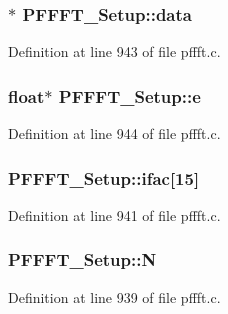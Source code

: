 \subsubsection[{\texorpdfstring{data}{data}}]{$\ast$ P\+F\+F\+F\+T\+\_\+\+Setup\+::data}\hypertarget{struct_p_f_f_f_t___setup_a52a6ca29e3a4c59f54070a622db4ec3f}{}\label{struct_p_f_f_f_t___setup_a52a6ca29e3a4c59f54070a622db4ec3f}


Definition at line 943 of file pffft.\+c.

\subsubsection[{\texorpdfstring{e}{e}}]{\setlength{\rightskip}{0pt plus 5cm}float$\ast$ P\+F\+F\+F\+T\+\_\+\+Setup\+::e}\hypertarget{struct_p_f_f_f_t___setup_af063d9d895bb58628cd9116079cc72b6}{}\label{struct_p_f_f_f_t___setup_af063d9d895bb58628cd9116079cc72b6}


Definition at line 944 of file pffft.\+c.

\subsubsection[{\texorpdfstring{ifac}{ifac}}]{ P\+F\+F\+F\+T\+\_\+\+Setup\+::ifac\mbox{[}15\mbox{]}}\hypertarget{struct_p_f_f_f_t___setup_a71ab430945d91b2e534e1c6c50a7fbdf}{}\label{struct_p_f_f_f_t___setup_a71ab430945d91b2e534e1c6c50a7fbdf}


Definition at line 941 of file pffft.\+c.

\subsubsection[{\texorpdfstring{N}{N}}]{ P\+F\+F\+F\+T\+\_\+\+Setup\+::N}\hypertarget{struct_p_f_f_f_t___setup_a328951e60dcbf47bb9d89946cf67571d}{}\label{struct_p_f_f_f_t___setup_a328951e60dcbf47bb9d89946cf67571d}


Definition at line 939 of file pffft.\+c.

